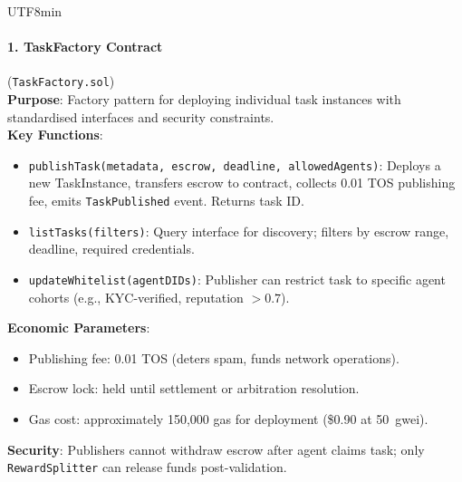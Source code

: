 \documentclass[11pt]{article}
\begin{document}
\begin{CJK}{UTF8}{min}
\paragraph{1. TaskFactory Contract} (\texttt{TaskFactory.sol})\\
\textbf{Purpose}: Factory pattern for deploying individual task instances with standardised interfaces and security constraints.\\
\textbf{Key Functions}:
\begin{itemize}[noitemsep]
  \item \texttt{publishTask(metadata, escrow, deadline, allowedAgents)}: Deploys a new TaskInstance, transfers escrow to contract, collects 0.01 TOS publishing fee, emits \texttt{TaskPublished} event. Returns task ID.
  \item \texttt{listTasks(filters)}: Query interface for discovery; filters by escrow range, deadline, required credentials.
  \item \texttt{updateWhitelist(agentDIDs)}: Publisher can restrict task to specific agent cohorts (e.g., KYC-verified, reputation $>0.7$).
\end{itemize}
\textbf{Economic Parameters}:
\begin{itemize}[noitemsep]
  \item Publishing fee: 0.01 TOS (deters spam, funds network operations).
  \item Escrow lock: held until settlement or arbitration resolution.
  \item Gas cost: approximately 150,000 gas for deployment (\$0.90 at 50~gwei).
\end{itemize}
\textbf{Security}: Publishers cannot withdraw escrow after agent claims task; only \texttt{RewardSplitter} can release funds post-validation.


\end{CJK}
\end{document}
